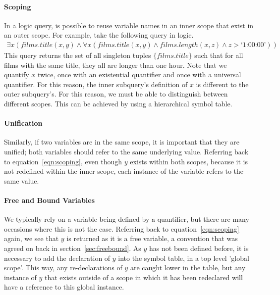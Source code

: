 \documentclass[a4paper, 11pt]{article}
\begin{document}
      \paragraph{Scoping}
        In a logic query, is possible to reuse variable names in an inner
        scope that exist in an outer scope. For example, take the following
        query in logic.
        \begin{gather}
        \exists x(films.title(x, y) \land \forall x(films.title(x, y) \land
        films.length(x, z) \land z > \text{`1:00:00'})) \label{eqn:scoping}
        \end{gather}
        This query returns the set of all singleton tuples $\{films.title\}$ such
        that for all films with the same title, they all are longer than one
        hour. Note that we quantify $x$ twice, once with an existential
        quantifier and once with a universal quantifier. For this reason, the
        inner subquery's definition of $x$ is different to the outer subquery's.
        For this reason, we must be able to distinguish between different
        scopes. This can be achieved by using a hierarchical symbol table.

      \paragraph{Unification}
        Similarly, if two variables are in the same scope, it is important that
        they are unified; both variables should refer to the same underlying
        value. Referring back to equation~\ref{eqn:scoping}, even
        though $y$ exists within both scopes, because it is not redefined
        within the inner scope, each instance of the variable refers to the 
        same value.

      \paragraph{Free and Bound Variables}
        We typically rely on a variable being defined by a quantifier, but
        there are many occasions where this is not the case. Referring back to
        equation~\ref{eqn:scoping} again, we see that $y$ is returned as it is a
        free variable, a convention that was agreed on back in
        section~\ref{sec:freebound}. As $y$ has not been defined before, it is
        necessary to add the declaration of $y$ into the symbol table, in a top
        level 'global scope'. This way, any re-declarations of $y$ are caught
        lower in the table, but any instance of $y$ that exists outside of a
        scope in which it has been redeclared will have a reference to this
        global instance.
\end{document}
